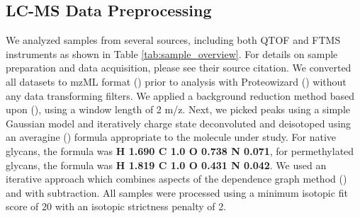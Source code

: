 \subsection{LC-MS Data Preprocessing}
    We analyzed samples from several sources, including both QTOF and FTMS
    instruments as shown in Table \ref{tab:sample_overview}. For details on sample preparation
    and data acquisition, please see their source citation. We converted all
    datasets to mzML format (\cite{Martens2011}) prior to analysis with Proteowizard
    (\cite{Kessner2008}) without any data transforming filters. We applied a background reduction
    method based upon (\cite{Kaur2006}), using a window length of 2 m/z. Next, we picked peaks using
    a simple Gaussian model and iteratively charge state deconvoluted and deisotoped using an
    averagine (\cite{Senko1995}) formula appropriate to the molecule under study. For native
    glycans, the formula was \textbf{H 1.690 C 1.0 O 0.738 N 0.071}, for permethylated glycans,
    the formula was \textbf{H 1.819 C 1.0 O 0.431 N 0.042}. We used an iterative approach which combines
    aspects of the dependence graph method (\cite{Liu2010}) and with subtraction. All samples
    were processed using a minimum isotopic fit score of 20 with an isotopic strictness penalty
    of 2.


